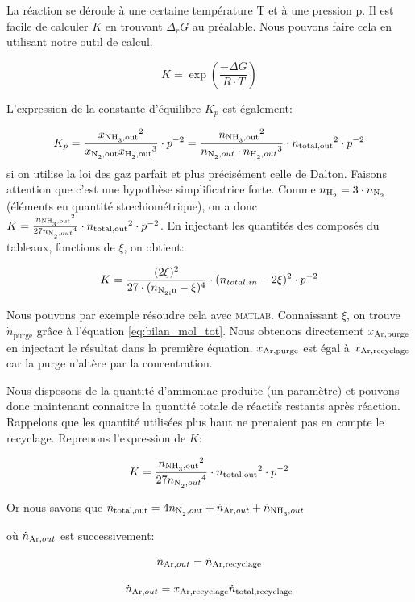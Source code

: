 La réaction se déroule à une certaine température T et à une pression p. 
Il est facile de calculer $K$ en trouvant $\Delta_r G$ au préalable. 
Nous pouvons faire cela en utilisant notre outil de calcul.

\[
K=\exp{\left(\frac{-\Delta G}{R \cdot T}\right)}\]

L'expression de la constante d'équilibre $K_p$ est également: 

\[
K_p=\frac{{x_{\ce{NH3},\text{out}}}^2}{x_{\ce{N2},\text{out}}{x_{\ce{H2},\text{out}}}^3} \cdot p^{-2} = 
\frac{{n_{\ce{NH3},\text{out}}}^2}{n_{\ce{N2},out}\cdot {n_{\ce{H2},out}}^3}\cdot {n_{\text{total,out}}}^2\cdot p^{-2}
\]
si on utilise la loi des gaz parfait et plus précisément celle de Dalton. Faisons attention que c'est une hypothèse simplificatrice forte. 
Comme $n_{\ce{H2}}=3\cdot n_{\ce{N2}}$ (éléments en quantité stœchiométrique), 
on a donc 
$K=\frac{{n_{\ce{NH3},\text{out}}}^2}{27{n_{\ce{N2},out}}^4} \cdot
{n_{\text{total,out}}}^2\cdot p^{-2}$. 
En injectant les quantités des composés du tableaux, fonctions de $\xi$, on obtient:

\[ 
K = 
\frac{({2\xi})^2}{27 \cdot ({{n_{\ce{N2,in}}-\xi})^4}} \cdot
({n_{total,in}-2\xi})^2 \cdot p^{-2} 
\]

Nous pouvons par exemple résoudre cela avec \textsc{matlab}. 
Connaissant $\xi$, on trouve $\dot{n}_{\text{purge}}$
grâce à l'équation \ref{eq:bilan_mol_tot}. 
Nous obtenons directement $x_{\ce{Ar},\text{purge}}$ en injectant 
le résultat dans la première équation. 
$x_{\ce{Ar},\text{purge}}$ est égal à $x_{\ce{Ar},\text{recyclage}}$ 
car la purge n'altère par la concentration.

Nous disposons de la quantité d'ammoniac produite (un paramètre) 
et pouvons donc maintenant connaitre la quantité totale de réactifs restants après réaction. 
Rappelons que les quantité utilisées plus haut ne prenaient pas en compte le recyclage. 
Reprenons l'expression de $K$: 

\[ 
K = 
\frac{{n_{\ce{NH3},\text{out}}}^2}{27{n_{\ce{N2},out}}^4} \cdot 
{n_{\text{total,out}}}^2\cdot p^{-2}
\]

Or nous savons que $\dot{n}_{\text{total,out}} = 
4\dot{n}_{\ce{N2},out}+\dot{n}_{\ce{Ar},out}+\dot{n}_{\ce{NH3},out}$ 

où $\dot{n}_{\ce{Ar},out}$ est successivement:

\[\dot{n}_{\ce{Ar},out}=\dot{n}_{\ce{Ar},\text{recyclage}}\]

\[ \dot{n}_{\ce{Ar},out}=x_{\ce{Ar},\text{recyclage}}\dot{n}_{\text{total,recyclage}} \]

